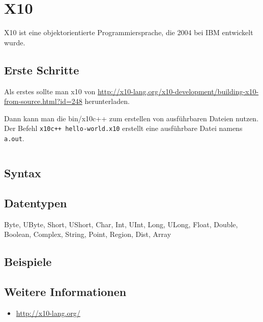 \chapter{X10}%
X10 ist eine objektorientierte Programmiersprache, die 2004 bei IBM entwickelt
wurde.

\section{Erste Schritte}
Als erstes sollte man x10 von \url{http://x10-lang.org/x10-development/building-x10-from-source.html?id=248} herunterladen.

Dann kann man die bin/x10c++ zum erstellen von ausführbaren Dateien nutzen.
Der Befehl \texttt{x10c++ hello-world.x10} erstellt eine ausführbare Datei namens
\texttt{a.out}.

\inputminted[numbersep=5pt, tabsize=4, frame=lines, label=hello-world.x10]{cpp}{scripts/x10/hello-world.x10}

\section{Syntax}
\section{Datentypen}
Byte, UByte, Short, UShort, Char, Int, UInt, Long, ULong, Float, Double, Boolean, Complex, String, Point, Region, Dist, Array

\section{Beispiele}

\section{Weitere Informationen}
\begin{itemize}
    \item \url{http://x10-lang.org/}
\end{itemize}
